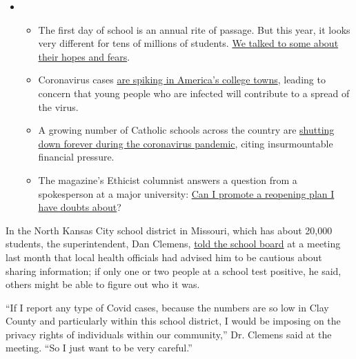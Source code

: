 \begin{itemize}
\item
  \begin{itemize}
  \tightlist
  \item
    The first day of school is an annual rite of passage. But this year,
    it looks very different for tens of millions of students.
    \href{https://www.nytimes3xbfgragh.onion/2020/09/05/us/virtual-return-to-school-covid.html?action=click\&pgtype=Article\&state=default\&region=MAIN_CONTENT_3\&context=storylines_keepup}{We
    talked to some about their hopes and fears}.
  \item
    Coronavirus cases
    \href{https://www.nytimes3xbfgragh.onion/2020/09/06/us/colleges-coronavirus-students.html?action=click\&pgtype=Article\&state=default\&region=MAIN_CONTENT_3\&context=storylines_keepup}{are
    spiking in America's college towns}, leading to concern that young
    people who are infected will contribute to a spread of the virus.
  \item
    A growing number of Catholic schools across the country are
    \href{https://www.nytimes3xbfgragh.onion/2020/09/05/us/catholic-school-closings.html?action=click\&pgtype=Article\&state=default\&region=MAIN_CONTENT_3\&context=storylines_keepup}{shutting
    down forever during the coronavirus pandemic}, citing insurmountable
    financial pressure.
  \item
    The magazine's Ethicist columnist answers a question from a
    spokesperson at a major university:
    \href{https://www.nytimes3xbfgragh.onion/2020/09/08/magazine/university-reopening-safety-ethics.html?action=click\&pgtype=Article\&state=default\&region=MAIN_CONTENT_3\&context=storylines_keepup}{Can
    I promote a reopening plan I have doubts about}?
  \end{itemize}
\end{itemize}

In the North Kansas City school district in Missouri, which has about
20,000 students, the superintendent, Dan Clemens,
\href{https://www.kcur.org/education/2020-07-30/metro-kansas-city-schools-wont-be-able-to-open-in-september-if-cases-dont-start-going-down}{told
the school board} at a meeting last month that local health officials
had advised him to be cautious about sharing information; if only one or
two people at a school test positive, he said, others might be able to
figure out who it was.

``If I report any type of Covid cases, because the numbers are so low in
Clay County and particularly within this school district, I would be
imposing on the privacy rights of individuals within our community,''
Dr. Clemens said at the meeting. ``So I just want to be very careful.''

